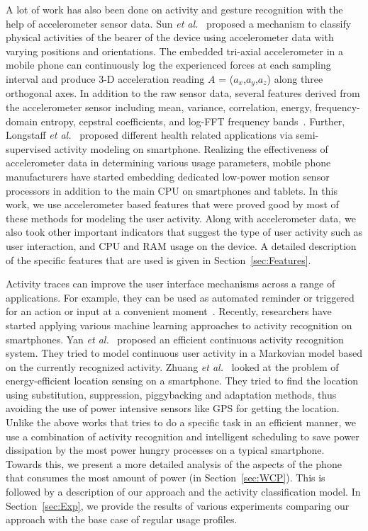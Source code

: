 A lot of work has also been done on activity and gesture recognition with the help of accelerometer sensor
data. Sun {\em et al.}~\cite{Sun} proposed a mechanism to classify physical activities of the bearer of the device
using accelerometer data with varying positions and orientations. The embedded tri-axial accelerometer in a
mobile phone can continuously log the experienced forces at each sampling interval and produce 3-D
acceleration reading $A$ = ($a_x$,$a_y$,$a_z$) along three orthogonal axes. In addition to the raw sensor
data, several features derived from the accelerometer sensor including mean, variance, correlation, energy,
frequency-domain entropy, cepstral coefficients, and log-FFT frequency bands~\cite{bao,lester,ravi,maurer,lester2,wu,rai,weiss}.
Further, Longstaff {\em et al.}~\cite{longstaff} proposed different health related applications via semi-supervised
activity modeling on smartphone. Realizing the effectiveness of accelerometer data in determining various usage
parameters, mobile phone manufacturers have started embedding dedicated low-power motion sensor processors
in addition to the main CPU on smartphones and tablets. In this work, we use accelerometer based features that
were proved good by most of these methods for modeling the user activity. Along with accelerometer data, we
also took other important indicators that suggest the type of user activity such as user interaction, and CPU and RAM
usage on the device. A detailed description of the specific features that are used is given in Section~\ref{sec:Features}.

Activity traces can improve the user interface mechanisms across a range of applications. For example, they can
be used as automated reminder or triggered for an action or input at a convenient moment~\cite{elder}. Recently,
researchers have started applying various machine learning approaches to activity recognition on smartphones.
Yan {\em et al.}~\cite{yan} proposed an efficient continuous activity recognition system. They tried to model
continuous user activity in a Markovian model based on the currently recognized activity. Zhuang {\em et al.}~\cite{location}
looked at the problem of energy-efficient location sensing on a smartphone. They tried to find the location using
substitution, suppression, piggybacking and adaptation methods, thus avoiding the use of power intensive
sensors like GPS for getting the location. Unlike the above works that tries to do a specific task in an efficient
manner, we use a combination of activity recognition and intelligent scheduling to save power dissipation by
the most power hungry processes on a typical smartphone.
Towards this, we present a more detailed analysis of the aspects of the phone that consumes the most
amount of power (in Section~\ref{sec:WCP}). This is followed by a description of our approach and the
activity classification model. In Section~\ref{sec:Exp}, we provide the results of various experiments
comparing our approach with the base case of regular usage profiles.

